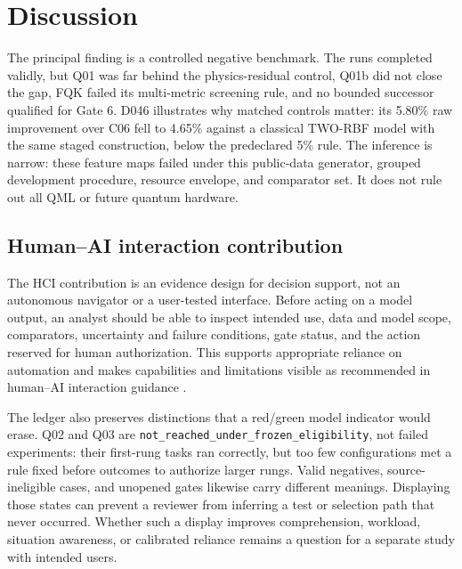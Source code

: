 \section{Discussion}
\label{sec:discussion}

The principal finding is a controlled negative benchmark. The runs completed
validly, but Q01 was far behind the physics-residual control, Q01b did not close
the gap, FQK failed its multi-metric screening rule, and no bounded successor
qualified for Gate 6. D046 illustrates why matched controls matter: its 5.80\%
raw improvement over C06 fell to 4.65\% against a classical TWO-RBF model with
the same staged construction, below the predeclared 5\% rule. The inference is
narrow: these feature maps failed under this public-data generator, grouped
development procedure, resource envelope, and comparator set. It does not rule
out all QML or future quantum hardware.

\subsection{Human--AI interaction contribution}

The HCI contribution is an evidence design for decision support, not an
autonomous navigator or a user-tested interface. Before acting on a model
output, an analyst should be able to inspect intended use, data and model
scope, comparators, uncertainty and failure conditions, gate status, and the
action reserved for human authorization. This supports appropriate reliance
on automation \cite{lee2004} and makes capabilities and limitations visible as
recommended in human--AI interaction guidance \cite{amershi2019}.

The ledger also preserves distinctions that a red/green model indicator would
erase. Q02 and Q03 are
\texttt{not\_reached\_under\_frozen\_eligibility}, not failed experiments:
their first-rung tasks ran correctly, but too few configurations met a rule
fixed before outcomes to authorize larger rungs. Valid negatives,
source-ineligible cases, and unopened gates likewise carry different meanings.
Displaying those states can prevent a reviewer from inferring a test or
selection path that never occurred. Whether such a display improves
comprehension, workload, situation awareness, or calibrated reliance remains a
question for a separate study with intended users.

